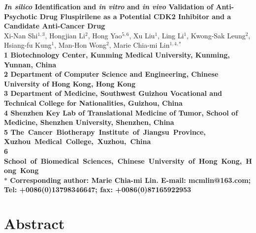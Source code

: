 \documentclass[10pt]{article}
\date{}
\begin{document}
\begin{flushleft}
{\Large
\textbf{\textit{In silico} Identification and \textit{in vitro} and \textit{in vivo} Validation of Anti-Psychotic Drug Fluspirilene as a Potential CDK2 Inhibitor and a Candidate Anti-Cancer Drug}
}
\\
Xi-Nan Shi$^{1,3}$,%
Hongjian Li$^{2}$,%
Hong Yao$^{5,6}$,%
Xu Liu$^{1}$,%
Ling Li$^{1}$,%
Kwong-Sak Leung$^{2}$,%
Hsiang-fu Kung$^{1}$,%
Man-Hon Wong$^{2}$,%
Marie Chia-mi Lin$^{1,4,\ast}$%
\\
\bf{1} Biotechnology Center, Kunming Medical University, Kunming, Yunnan, China\\
\bf{2} Department of Computer Science and Engineering, Chinese University of Hong Kong, Hong Kong\\
\bf{3} Department of Medicine, Southwest Guizhou Vocational and Technical College for Nationalities, Guizhou, China\\
\bf{4} Shenzhen Key Lab of Translational Medicine of Tumor, School of Medicine, Shenzhen University, Shenzhen, China\\
\bf{5} The Cancer Biotherapy Institute of Jiangsu Province, Xuzhou Medical College, Xuzhou, China\\
\bf{6} School of Biomedical Sciences, Chinese University of Hong Kong, Hong Kong\\
$\ast$ Corresponding author: Marie Chia-mi Lin. E-mail: mcmlin@163.com; Tel: +0086(0)13798346647; fax: +0086(0)87165922953
\end{flushleft}

\section*{Abstract}
\end{document}
